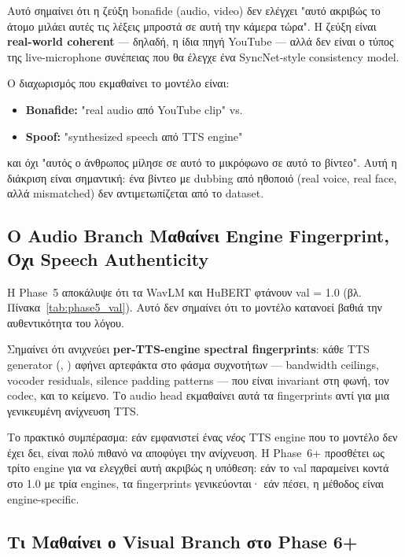 Αυτό σημαίνει ότι η ζεύξη bonafide (audio, video)
δεν ελέγχει "αυτό ακριβώς το άτομο μιλάει αυτές τις λέξεις μπροστά σε αυτή την κάμερα τώρα".
Η ζεύξη είναι \textbf{real-world coherent} —
δηλαδή, η ίδια πηγή YouTube — αλλά δεν είναι
ο τύπος της live-microphone συνέπειας που θα έλεγχε
ένα SyncNet-style consistency model.

Ο διαχωρισμός που εκμαθαίνει το μοντέλο είναι:
\begin{itemize}
  \item \textbf{Bonafide:} "real audio από YouTube clip" vs.
  \item \textbf{Spoof:} "synthesized speech από TTS engine"
\end{itemize}
και όχι "αυτός ο άνθρωπος μίλησε σε αυτό το μικρόφωνο σε αυτό το βίντεο".
Αυτή η διάκριση είναι σημαντική:
ένα βίντεο με dubbing από ηθοποιό (real voice, real face, αλλά mismatched)
δεν αντιμετωπίζεται από το dataset.

\subsection{Ο Audio Branch Μαθαίνει Engine Fingerprint, Όχι Speech Authenticity}
\label{subsec:engine-fingerprint}

Η Phase~5 αποκάλυψε ότι τα WavLM και HuBERT φτάνουν
val \AUC{} = 1.0 (βλ. Πίνακα~\ref{tab:phase5_val}).
Αυτό δεν σημαίνει ότι το μοντέλο κατανοεί βαθιά
την αυθεντικότητα του λόγου.

Σημαίνει ότι ανιχνεύει \textbf{per-TTS-engine spectral fingerprints}:
κάθε TTS generator (, )
αφήνει αρτεφάκτα στο φάσμα συχνοτήτων —
bandwidth ceilings, vocoder residuals, silence padding patterns —
που είναι invariant στη φωνή, τον codec, και το κείμενο.
Το audio head εκμαθαίνει αυτά τα fingerprints
αντί για μια γενικευμένη ανίχνευση TTS.

Το πρακτικό συμπέρασμα:
εάν εμφανιστεί ένας \emph{νέος} TTS engine που το μοντέλο δεν έχει δει,
είναι πολύ πιθανό να αποφύγει την ανίχνευση.
Η Phase~6+ προσθέτει  ως τρίτο engine
για να ελεγχθεί αυτή ακριβώς η υπόθεση:
εάν το val \AUC{} παραμείνει κοντά στο 1.0 με τρία engines,
τα fingerprints γενικεύονται·
εάν πέσει, η μέθοδος είναι engine-specific.

\subsection{Τι Μαθαίνει ο Visual Branch στο Phase 6+}
\label{subsec:visual-phase6}


